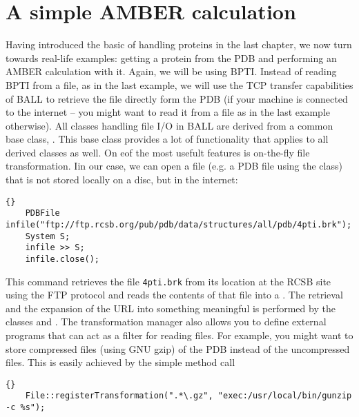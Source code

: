 \section{A simple AMBER calculation}

Having introduced the basic of handling proteins in the last
chapter, we now turn towards real-life examples: getting a protein
from the PDB and performing an AMBER calculation with it.
Again, we will be using BPTI. Instead of reading BPTI from a 
file, as in the last example, we will use the TCP transfer
capabilities of BALL to retrieve the file directly form the 
PDB (if your machine is connected to the internet -- you might
want to read it from a file as in the last example otherwise).
All classes handling file I/O in BALL are derived from a common
base class, . This base class provides a lot of
functionality that applies to all derived classes as well.
On eof the most usefult features is on-the-fly file transformation.
Iin our case, we can open a file (e.g. a PDB file using the  
class) that is not stored locally on a disc, but in the internet:

\begin{lstlisting}{}
	PDBFile infile("ftp://ftp.rcsb.org/pub/pdb/data/structures/all/pdb/4pti.brk");
	System S;
	infile >> S;
	infile.close();
\end{lstlisting}

\noindent
This command retrieves the file {\tt 4pti.brk} from its location at the RCSB
site using the FTP protocol and reads the contents of that file into a
. The retrieval and the expansion of the URL into something
meaningful is performed by the classes  and
. The transformation manager also allows you to define 
external programs that can act as a filter for reading files. For example,
you might want to store compressed files (using GNU gzip) of the PDB
instead of the uncompressed files. This is easily achieved by the simple
method call 

\begin{lstlisting}{}
	File::registerTransformation(".*\.gz", "exec:/usr/local/bin/gunzip -c %s");
\end{lstlisting}

\noindent
